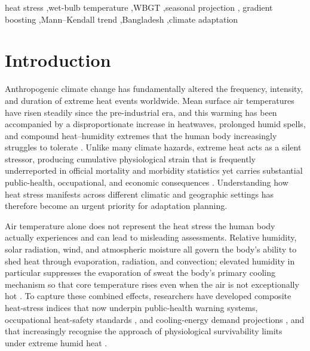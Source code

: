 \documentclass[review,11pt]{elsarticle}
\begin{document}
\begin{frontmatter}
\begin{keyword}
heat stress \sep wet-bulb temperature \sep WBGT \sep seasonal projection \sep
gradient boosting \sep Mann--Kendall trend \sep Bangladesh \sep climate adaptation
\end{keyword}

\end{frontmatter}

\linenumbers

\section{Introduction}\label{sec:intro}
Anthropogenic climate change has fundamentally altered the frequency, intensity,
and duration of extreme heat events worldwide. Mean surface air temperatures have
risen steadily since the pre-industrial era, and this warming has been accompanied
by a disproportionate increase in heatwaves, prolonged humid spells, and compound
heat--humidity extremes that the human body increasingly struggles to tolerate
\citep{Shaw2022IPCCAsia}. Unlike many climate hazards, extreme heat acts as a
silent stressor, producing cumulative physiological strain that is frequently
underreported in official mortality and morbidity statistics yet carries
substantial public-health, occupational, and economic consequences
\citep{Kjellstrom2019}. Understanding how heat stress manifests across different
climatic and geographic settings has therefore become an urgent priority for
adaptation planning.

Air temperature alone does not represent the heat stress the human body actually
experiences and can lead to misleading assessments. Relative humidity, solar
radiation, wind, and atmospheric moisture all govern the body's ability to shed
heat through evaporation, radiation, and convection; elevated humidity in
particular suppresses the evaporation of sweat the body's primary cooling
mechanism so that core temperature rises even when the air is not exceptionally
hot \citep{steadman1979}. To capture these combined effects, researchers have
developed composite heat-stress indices that now underpin public-health warning
systems, occupational heat-safety standards \citep{iso7243_2017}, and cooling-energy
demand projections \citep{spinoni2018}, and that increasingly recognise the
approach of physiological survivability limits under extreme humid heat
\citep{raymond2020}.
\end{document}

